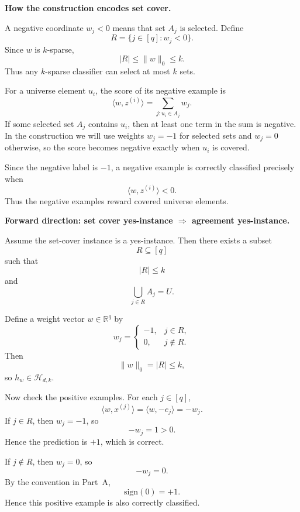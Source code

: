 \documentclass[11pt]{article}
\newcommand{\sign}{\mathrm{sign}}
\begin{document}
\begin{enumerate}
\begin{solutionbox}
        \medskip

        \textbf{How the construction encodes set cover.}

        A negative coordinate $w_j<0$ means that set $A_j$ is selected. Define
        \[
        R=\{j\in[q]:w_j<0\}.
        \]
        Since $w$ is $k$-sparse,
        \[
        |R|\le \|w\|_0\le k.
        \]
        Thus any $k$-sparse classifier can select at most $k$ sets.

        For a universe element $u_i$, the score of its negative example is
        \[
        \langle w,z^{(i)}\rangle
        =
        \sum_{j:u_i\in A_j} w_j.
        \]
        If some selected set $A_j$ contains $u_i$, then at least one term in the sum is negative.
        In the construction we will use weights $w_j=-1$ for selected sets and $w_j=0$ otherwise,
        so the score becomes negative exactly when $u_i$ is covered.

        Since the negative label is $-1$, a negative example is correctly classified precisely when
        \[
        \langle w,z^{(i)}\rangle<0.
        \]
        Thus the negative examples reward covered universe elements.

        \medskip

        \textbf{Forward direction: set cover yes-instance $\Rightarrow$ agreement yes-instance.}

        Assume the set-cover instance is a yes-instance. Then there exists a subset
        \[
        R\subseteq[q]
        \]
        such that
        \[
        |R|\le k
        \]
        and
        \[
        \bigcup_{j\in R}A_j=U.
        \]

        Define a weight vector $w\in\mathbb{R}^q$ by
        \[
        w_j=
        \begin{cases}
        -1, & j\in R,\\
        0, & j\notin R.
        \end{cases}
        \]
        Then
        \[
        \|w\|_0=|R|\le k,
        \]
        so $h_w\in\mathcal{H}_{d,k}$.

        Now check the positive examples. For each $j\in[q]$,
        \[
        \langle w,x^{(j)}\rangle
        =
        \langle w,-e_j\rangle
        =
        -w_j.
        \]
        If $j\in R$, then $w_j=-1$, so
        \[
        -w_j=1>0.
        \]
        Hence the prediction is $+1$, which is correct.

        If $j\notin R$, then $w_j=0$, so
        \[
        -w_j=0.
        \]
        By the convention in Part~A,
        \[
        \sign(0)=+1.
        \]
        Hence this positive example is also correctly classified.


\end{solutionbox}
\end{enumerate}
\end{document}
